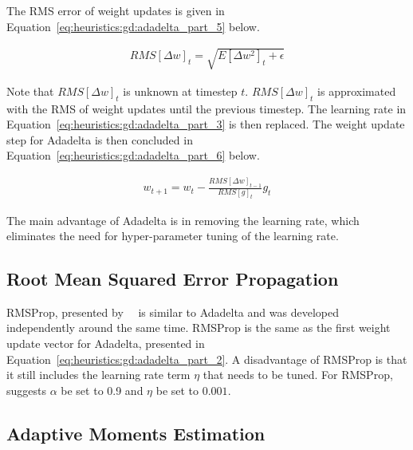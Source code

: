 \noindent
The \acf{RMS} error of weight updates is given in Equation~\eqref{eq:heuristics:gd:adadelta_part_5} below.

\begin{equation}
      \label{eq:heuristics:gd:adadelta_part_5}
      \begin{split}
            RMS[\Delta w]_{t} = \sqrt{E[\Delta w^{2}]_{t} + \epsilon}
      \end{split}
\end{equation}

\noindent
Note that $RMS[\Delta w]_{t}$ is unknown at timestep $t$. $RMS[\Delta w]_{t}$ is approximated with the \acf{RMS} of weight updates until the previous timestep. The learning rate in Equation~\eqref{eq:heuristics:gd:adadelta_part_3} is then replaced. The weight update step for \acs{Adadelta} is then concluded in Equation~\eqref{eq:heuristics:gd:adadelta_part_6} below.

\begin{equation}
      \label{eq:heuristics:gd:adadelta_part_6}
      \begin{split}
            w_{t+1} = w_{t} - \frac{RMS[\Delta w]_{t-1}}{RMS[g]_{t}} g_{t}
      \end{split}
\end{equation}

\noindent
The main advantage of \acs{Adadelta} is in removing the learning rate, which eliminates the need for hyper-parameter tuning of the learning rate.

\subsection{Root Mean Squared Error Propagation}\label{sec:heuristics:rmsprop}

\Acf{RMSProp}, presented by~\citeauthor{ref:hinton:2012}~\cite{ref:hinton:2012} is similar to \acs{Adadelta}  and was developed independently around the same time. \acs{RMSProp} is the same as the first weight update vector for \acs{Adadelta}, presented in Equation~\eqref{eq:heuristics:gd:adadelta_part_2}. A disadvantage of \acs{RMSProp} is that it still includes the learning rate term $\eta$ that needs to be tuned. For \acs{RMSProp},~\citeauthor{ref:hinton:2012}~\cite{ref:hinton:2012} suggests $\alpha$ be set to 0.9 and $\eta$ be set to $0.001$.


\subsection{Adaptive Moments Estimation}\label{sec:heuristics:adam}

